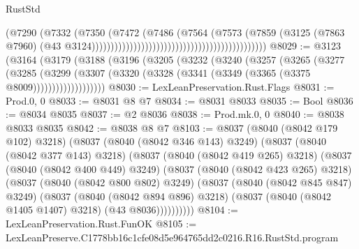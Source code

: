 \begin{lexlean}{RustStd}
\begin{coremodule}
                                                                            (@7290
                                                                              (@7332
                                                                                (@7350
                                                                                  (@7472
                                                                                    (@7486
                                                                                      (@7564
                                                                                        (@7573
                                                                                          (@7859
                                                                                            (@3125
                                                                                              (@7863
                                                                                                @7960)
                                                                                              (@43
                                                                                                @3124))))))))))))))))))))))))))))))))))))))))))))))
@8029 := @3123
    (@3164
      (@3179
        (@3188
          (@3196
            (@3205
              (@3232
                (@3240
                  (@3257
                    (@3265
                      (@3277
                        (@3285
                          (@3299
                            (@3307
                              (@3320 (@3328 (@3341 (@3349 (@3365 (@3375 @8009)))))))))))))))))))
@8030 := LexLeanPreservation.Rust.Flags
@8031 := Prod.{0, 0}
@8033 := @8031 @8 @7
@8034 := @8031 @8033
@8035 := Bool
@8036 := @8034 @8035
@8037 := @2 @8036
@8038 := Prod.mk.{0, 0}
@8040 := @8038 @8033 @8035
@8042 := @8038 @8 @7
@8103 := @8037
    (@8040 (@8042 @179 @102) @3218)
    (@8037
      (@8040 (@8042 @346 @143) @3249)
      (@8037
        (@8040 (@8042 @377 @143) @3218)
        (@8037
          (@8040 (@8042 @419 @265) @3218)
          (@8037
            (@8040 (@8042 @400 @449) @3249)
            (@8037
              (@8040 (@8042 @423 @265) @3218)
              (@8037
                (@8040 (@8042 @800 @802) @3249)
                (@8037
                  (@8040 (@8042 @845 @847) @3249)
                  (@8037
                    (@8040 (@8042 @894 @896) @3218)
                    (@8037 (@8040 (@8042 @1405 @1407) @3218) (@43 @8036))))))))))
@8104 := LexLeanPreservation.Rust.FunOK
@8105 := LexLeanPreserve.C1778bb16c1cfe08d5e964765dd2c0216.R16.RustStd.program

\end{coremodule}
\end{lexlean}

